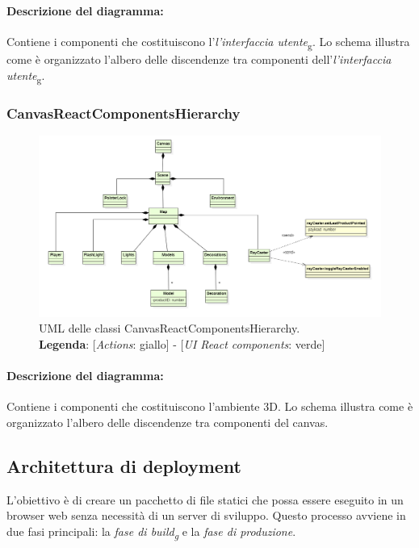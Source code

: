 \paragraph*{Descrizione del diagramma:}
Contiene i componenti che costituiscono l'\textit{l'interfaccia 
		utente}\textsubscript{g}.
Lo schema illustra come è organizzato l'albero delle discendenze tra componenti dell'\textit{l'interfaccia 
		utente}\textsubscript{g}.
\begin{landscape}
\thispagestyle{empty}
\subsubsection{CanvasReactComponentsHierarchy}
\begin{figure}[H]
	\centering
	\includegraphics[scale=0.7 , keepaspectratio]{./res/images/canvasReactComponentsHierarchy.PNG}
	\caption[UML delle classi CanvasReactComponentsHierarchy]{
	UML delle classi CanvasReactComponentsHierarchy.
	\\
	\textbf{Legenda}: 
	[\textit{Actions}: giallo] -
	[\textit{UI React components}: verde]}
\end{figure}
\end{landscape}
\restoregeometry

\paragraph*{Descrizione del diagramma:}
Contiene i componenti che costituiscono l'ambiente 3D.
Lo schema illustra come è organizzato l'albero delle discendenze tra componenti del canvas.

\subsection{Architettura di deployment}
L'obiettivo è di creare un pacchetto di file statici che possa essere eseguito in un browser web senza necessità di un server di sviluppo.
Questo processo avviene in due fasi principali: la \textit{fase di build\textsubscript{g}} e la \textit{fase di produzione}.

